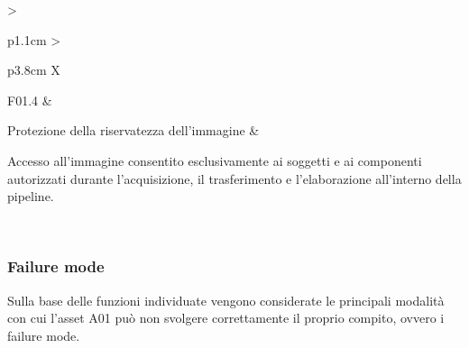 {\begin{xltabular}{\textwidth}{
    >{\raggedright\arraybackslash}p{1.1cm}
    >{\raggedright\arraybackslash}p{3.8cm}
    X
}
\midrule


F01.4 &

Protezione della riservatezza dell'immagine &

Accesso all'immagine consentito esclusivamente ai soggetti e ai componenti
autorizzati durante l'acquisizione, il trasferimento e l'elaborazione
all'interno della pipeline. \\

\bottomrule

\caption{Funzioni e prerequisiti dell'asset A01 - Immagine dermatologica.}

\label{tab:a01-functions}\\

\end{xltabular}
}

\subsubsection{Failure mode}
Sulla base delle funzioni individuate vengono considerate le principali modalità con cui l'asset A01 può non svolgere correttamente il proprio compito, ovvero i failure mode.

